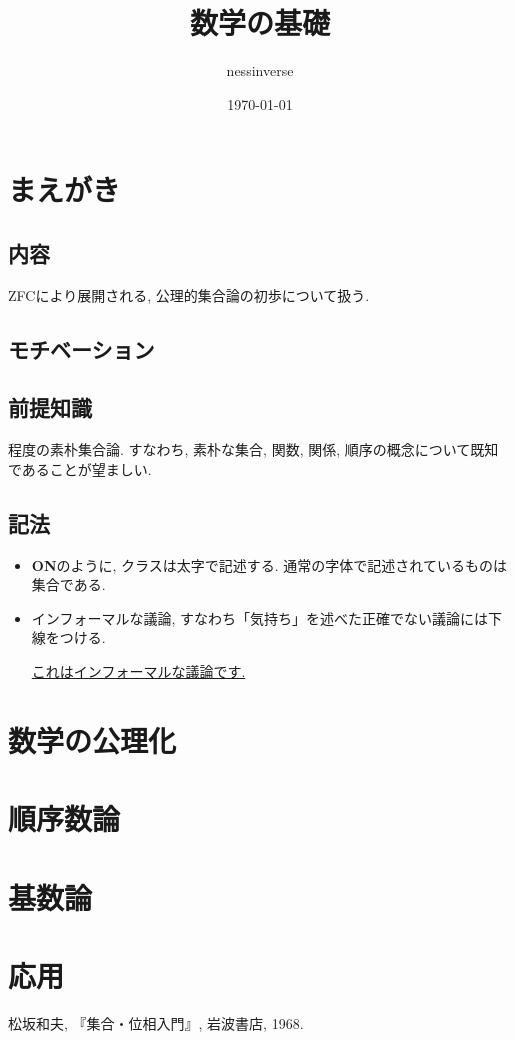 \documentclass[a4paper]{bxjsarticle}
\title{数学の基礎}
\author{nessinverse}
\date{\today}
\theoremstyle{definition}
\begin{document}
    \maketitle
    
    \section*{まえがき}
    \subsection*{内容}
    ZFCにより展開される, 公理的集合論の初歩について扱う. 
    \subsection*{モチベーション}
    
    \subsection*{前提知識}
    \cite{matsuzaka}程度の素朴集合論. すなわち, 素朴な集合, 関数, 関係, 順序の概念について既知であることが望ましい.
    \subsection*{記法}
    \begin{itemize}
        \item \textbf{ON}のように, クラスは太字で記述する. 通常の字体で記述されているものは集合である.
        \item インフォーマルな議論, すなわち「気持ち」を述べた正確でない議論には下線をつける.
        
        \underline{これはインフォーマルな議論です.}
    \end{itemize}
    \newpage
    \tableofcontents
    \newpage    
    
    \section{数学の公理化}
    \section{順序数論}
    \section{基数論}
    \section{応用}
    \begin{thebibliography}{9}
     松坂和夫, 『集合・位相入門』, 岩波書店, 1968.
    
    \end{thebibliography}
\end{document}
